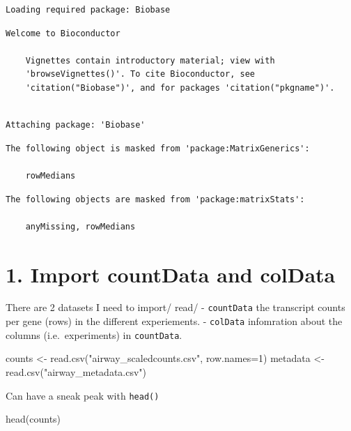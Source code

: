 \documentclass[
  letterpaper,
  DIV=11,
  numbers=noendperiod]{scrartcl}
\newenvironment{Shaded}{\begin{snugshade}}{\end{snugshade}}
\newcommand{\AttributeTok}[1]{\textcolor[rgb]{0.40,0.45,0.13}{#1}}
\newcommand{\DecValTok}[1]{\textcolor[rgb]{0.68,0.00,0.00}{#1}}
\newcommand{\FunctionTok}[1]{\textcolor[rgb]{0.28,0.35,0.67}{#1}}
\newcommand{\NormalTok}[1]{\textcolor[rgb]{0.00,0.23,0.31}{#1}}
\newcommand{\OtherTok}[1]{\textcolor[rgb]{0.00,0.23,0.31}{#1}}
\newcommand{\StringTok}[1]{\textcolor[rgb]{0.13,0.47,0.30}{#1}}
\begin{document}
\begin{verbatim}
Loading required package: Biobase
\end{verbatim}

\begin{verbatim}
Welcome to Bioconductor

    Vignettes contain introductory material; view with
    'browseVignettes()'. To cite Bioconductor, see
    'citation("Biobase")', and for packages 'citation("pkgname")'.
\end{verbatim}

\begin{verbatim}

Attaching package: 'Biobase'
\end{verbatim}

\begin{verbatim}
The following object is masked from 'package:MatrixGenerics':

    rowMedians
\end{verbatim}

\begin{verbatim}
The following objects are masked from 'package:matrixStats':

    anyMissing, rowMedians
\end{verbatim}

\section{1. Import countData and
colData}\label{import-countdata-and-coldata}

There are 2 datasets I need to import/ read/ - \texttt{countData} the
transcript counts per gene (rows) in the different experiements. -
\texttt{colData} infomration about the columns (i.e.~experiments) in
\texttt{countData}.

\begin{Shaded}
\begin{Highlighting}[]
\NormalTok{counts }\OtherTok{\textless{}{-}} \FunctionTok{read.csv}\NormalTok{(}\StringTok{"airway\_scaledcounts.csv"}\NormalTok{, }\AttributeTok{row.names=}\DecValTok{1}\NormalTok{)}
\NormalTok{metadata }\OtherTok{\textless{}{-}} \FunctionTok{read.csv}\NormalTok{(}\StringTok{"airway\_metadata.csv"}\NormalTok{)}
\end{Highlighting}
\end{Shaded}

Can have a sneak peak with \texttt{head()}

\begin{Shaded}
\begin{Highlighting}[]
\FunctionTok{head}\NormalTok{(counts)}
\end{Highlighting}
\end{Shaded}
\end{document}
